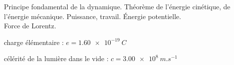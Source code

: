 \debutFicheEntrainement                                                                      %



\begin{prerequis}
Principe fondamental de la dynamique. Théorème de l'énergie cinétique, 
de l'énergie mécanique. Puissance, travail. Énergie potentielle. \\Force de Lorentz.

\constantesUtiles
	\begin{listeConstantes}
		\item charge élémentaire : $e=\SI{1.60e-19}{C}$
		\item célérité de la lumière dans le vide : $c=\SI{3.00e8}{m.s^{-1}}$
	\end{listeConstantes}

\end{prerequis}









\hauteurLargeurCadreReponse		{7mm}{3cm}
\initialisationEntrainement

